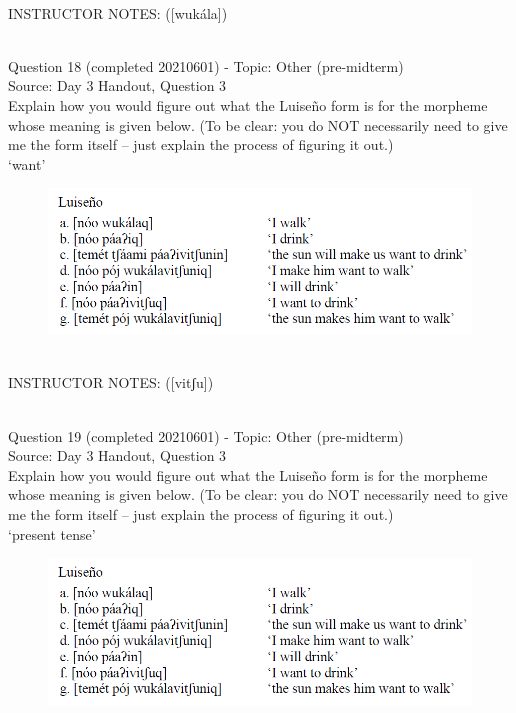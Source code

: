 \documentclass[12pt]{article}
\begin{document}
~\\
INSTRUCTOR NOTES: ([wukála])


~\\

{\large Question 18} (completed 20210601) - Topic: Other (pre-midterm)\\
Source: Day 3 Handout, Question 3\\

Explain how you would figure out what the Luiseño form is for the morpheme whose meaning is given below. (To be clear: you do NOT necessarily need to give me the form itself -- just explain the process of figuring it out.)\\

‘want’

\begin{figure}[H]
\includegraphics{../images/luiseno.png}
\end{figure}

~\\
INSTRUCTOR NOTES: ([vitʃu])


~\\

{\large Question 19} (completed 20210601) - Topic: Other (pre-midterm)\\
Source: Day 3 Handout, Question 3\\

Explain how you would figure out what the Luiseño form is for the morpheme whose meaning is given below. (To be clear: you do NOT necessarily need to give me the form itself -- just explain the process of figuring it out.)\\

‘present tense’

\begin{figure}[H]
\includegraphics{../images/luiseno.png}
\end{figure}
\end{document}
